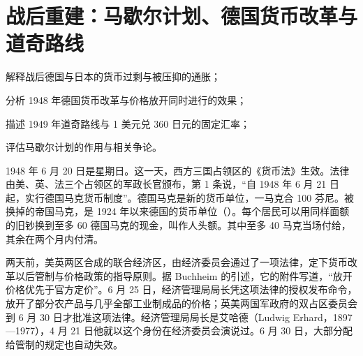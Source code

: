 \chapter{战后重建：马歇尔计划、德国货币改革与道奇路线}\label{ch:reconstruction}

\begin{chapterguide}
\begin{guidegoals}
\item 解释战后德国与日本的货币过剩与被压抑的通胀；
\item 分析 1948 年德国货币改革与价格放开同时进行的效果；
\item 描述 1949 年道奇路线与 1 美元兑 360 日元的固定汇率；
\item 评估马歇尔计划的作用与相关争论。
\end{guidegoals}
\end{chapterguide}

1948 年 6 月 20 日是星期日。这一天，西方三国占领区的《货币法》生效\cite{buchheim1988}。法律由美、英、法三个占领区的军政长官颁布，第 1 条说，“自 1948 年 6 月 21 日起，实行德国马克货币制度”\cite{waehrungsgesetz1948}。德国马克是新的货币单位，一马克合 100 芬尼\cite{waehrungsgesetz1948}。被换掉的帝国马克，是 1924 年以来德国的货币单位（）。每个居民可以用同样面额的旧钞换到至多 60 德国马克的现金，叫作人头额。其中至多 40 马克当场付给，其余在两个月内付清\cite{waehrungsgesetz1948}。

两天前，美英两区合成的联合经济区，由经济委员会通过了一项法律，定下货币改革以后管制与价格政策的指导原则\cite{buchheim1988}。据 Buchheim 的引述，它的附件写道，“放开价格优先于官方定价”\cite{buchheim1988}。6 月 25 日，经济管理局局长凭这项法律的授权发布命令，放开了部分农产品与几乎全部工业制成品的价格；英美两国军政府的双占区委员会到 6 月 30 日才批准这项法律\cite{buchheim1988}。经济管理局局长是艾哈德（Ludwig Erhard，1897—1977），4 月 21 日他就以这个身份在经济委员会演说过\cite{abelshauser1981,gnd35}。6 月 30 日，大部分配给管制的规定也自动失效\cite{buchheim1988}。


